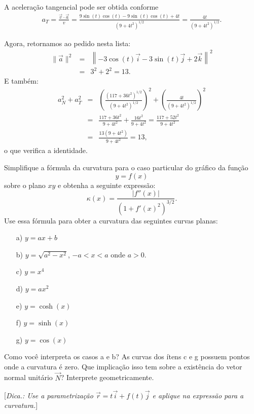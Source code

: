 \begin{resol}
A aceleração tangencial pode ser obtida conforme
\begin{eqnarray*}a_T=\frac{\vec{v}\cdot \vec{a}}{v}=\frac{9\sin(t)\cos(t) -9\sin(t) \cos(t)+4t}{\left(9+4t^2\right)^{1/2}}=\frac{4t}{\left(9+4t^2\right)^{1/2}}.
\end{eqnarray*}

Agora, retornamos ao pedido nesta lista:
\begin{eqnarray*}
 \|\vec{a}\|^2&=&\left\|-3\cos (t) \vec{i} - 3\sin (t) \vec{j} +2\vec{k}\right\|^2\\&=&3^2+2^2=13.
\end{eqnarray*}
E também:
\begin{eqnarray*}
a_N^2+a_T^2&=&\left(\frac{\left(117+36t^2\right)^{1/2}}{\left(9+4t^2\right)^{1/2}}\right)^2+\left(\frac{4t}{\left(9+4t^2\right)^{1/2}}\right)^2\\
&=&\frac{117+36t^2}{9+4t^2}+\frac{16t^2}{9+4t^2}=\frac{117+52t^2}{9+4t^2}\\&=&
\frac{13(9+4t^2)}{9+4t^2}=13,
\end{eqnarray*}
o que verifica a identidade.

\end{resol}



\begin{exeresol}
Simplifique a fórmula da curvatura para o caso particular do gráfico da função
$$y=f(x)$$
sobre o plano $xy$
e obtenha a seguinte expressão:
$$\kappa(x)=\frac{|f''(x)|}{\left(1+f'(x)^2\right)^{3/2}}.$$
Use essa fórmula para obter a curvatura das seguintes curvas planas:
\begin{itemize}
\item[a)] $y=ax+b$
\item[b)]$y=\sqrt{a^2-x^2}$, $-a<x<a$ onde $a>0$.
\item[c)] $y=x^4$
\item[d)] $y=ax^2$
\item[e)] $y=\cosh(x)$
\item[f)] $y=\sinh(x)$
\item[g)] $y=\cos(x)$
\end{itemize}
Como você interpreta os casos a e b? As curvas dos ítens c e g possuem pontos onde a curvatura é zero. Que implicação isso tem sobre a existência do vetor normal unitário $\vec{N}$? Interprete geometricamente.


[{\it Dica.: Use a parametrização $\vec{r}=t\vec{i}+f(t)\vec{j}$ e aplique na expressão para a curvatura.}]
\end{exeresol}


